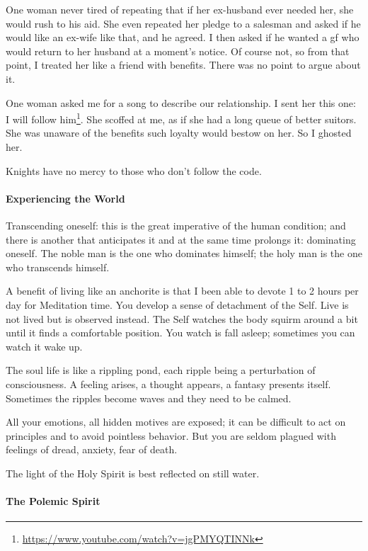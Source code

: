 One woman never tired of repeating that if her ex-husband ever needed her, she would rush to his aid. She even repeated her pledge to a salesman and asked if he would like an ex-wife like that, and he agreed. I then asked if he wanted a gf who would return to her husband at a moment's notice. Of course not, so from that point, I treated her like a friend with benefits. There was no point to argue about it.

One woman asked me for a song to describe our relationship. I sent her this one: I will follow him\footnote{\url{https://www.youtube.com/watch?v=jgPMYQTINNk}}. She scoffed at me, as if she had a long queue of better suitors. She was unaware of the benefits such loyalty would bestow on her. So I ghosted her.

Knights have no mercy to those who don't follow the code.

\paragraph{Experiencing the World}


\begin{quotex}
Transcending oneself: this is the great imperative of the human condition; and there is another that anticipates it and at the same time prolongs it: dominating oneself. The noble man is the one who dominates himself; the holy man is the one who transcends himself.
\end{quotex}


A benefit of living like an anchorite is that I been able to devote 1 to 2 hours per day for Meditation time. You develop a sense of detachment of the Self. Live is not lived but is observed instead. The Self watches the body squirm around a bit until it finds a comfortable position. You watch is fall asleep; sometimes you can watch it wake up.

The soul life is like a rippling pond, each ripple being a perturbation of consciousness. A feeling arises, a thought appears, a fantasy presents itself. Sometimes the ripples become waves and they need to be calmed.

All your emotions, all hidden motives are exposed; it can be difficult to act on principles and to avoid pointless behavior. But you are seldom plagued with feelings of dread, anxiety, fear of death.

The light of the Holy Spirit is best reflected on still water.

\paragraph{The Polemic Spirit}


